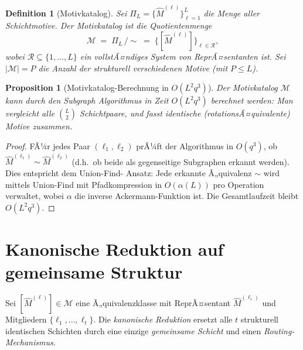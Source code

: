 ﻿\documentclass[12pt, a4paper, openany]{report}
\newtheorem{proposition}[theorem]{Proposition}
\newtheorem{definition}[theorem]{Definition}
\newcommand{\calR}{\mathcal{R}}
\newcommand{\calM}{\mathcal{M}}
\begin{document}
\begin{definition}[Motivkatalog]
\label{def:motif_catalog}
Sei $\Pi_L = \{\hat{M}^{(\ell)}\}_{\ell=1}^L$ die Menge aller Schichtmotive.
Der \emph{Motivkatalog} ist die Quotientenmenge
\[
  \calM \;=\; \Pi_L \,/\!\sim
  \;=\; \bigl\{[\hat{M}^{(\ell)}]\bigr\}_{\ell \in \calR},
\]
wobei $\calR \subseteq \{1,\ldots,L\}$ ein vollstÃ¤ndiges System von
ReprÃ¤sentanten ist.  Sei $|\calM| = P$ die Anzahl der strukturell
verschiedenen Motive (mit $P \leq L$).
\end{definition}

\begin{proposition}[Motivkatalog-Berechnung in $O(L^2 q^3)$]
\label{prop:catalog_complexity}
Der Motivkatalog $\calM$ kann durch den Subgraph Algorithmus in Zeit
$O(L^2 q^3)$ berechnet werden: Man vergleicht alle $\binom{L}{2}$
Schichtpaare, und fasst identische (rotationsÃ¤quivalente) Motive zusammen.
\end{proposition}

\begin{proof}
FÃ¼r jedes Paar $(\ell_1, \ell_2)$ prÃ¼ft der Algorithmus in $O(q^3)$,
ob $\hat{M}^{(\ell_1)} \sim \hat{M}^{(\ell_2)}$ (d.h.\ ob beide als
gegenseitige Subgraphen erkannt werden).  Dies entspricht dem Union-Find-
Ansatz: Jede erkannte Ã„quivalenz $\sim$ wird mittels Union-Find mit Pfadkompression
in $O(\alpha(L))$ pro Operation verwaltet, wobei $\alpha$ die inverse
Ackermann-Funktion ist.  Die Gesamtlaufzeit bleibt $O(L^2 q^3)$.
\end{proof}

\section{Kanonische Reduktion auf gemeinsame Struktur}
\label{sec:sgkr_reduction}

Sei $[\hat{M}^{(\ell)}] \in \calM$ eine Ã„quivalenzklasse mit ReprÃ¤sentant
$\hat{M}^{(\ell_r)}$ und Mitgliedern $\{\ell_1, \ldots, \ell_t\}$.
Die \emph{kanonische Reduktion} ersetzt alle $t$ strukturell identischen
Schichten durch eine einzige \emph{gemeinsame Schicht} und einen
\emph{Routing-Mechanismus}.
\end{document}
